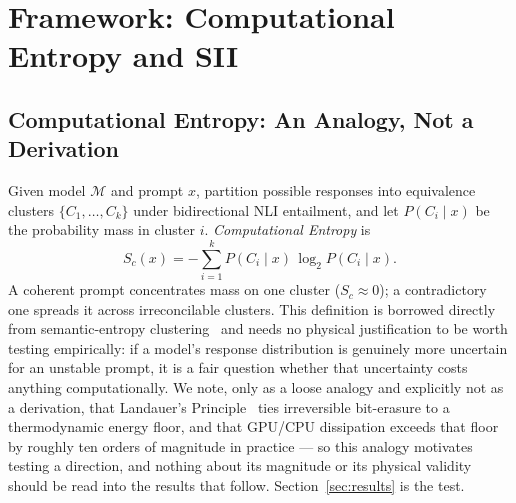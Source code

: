 \documentclass[conference]{IEEEtran}
\begin{document}
\section{Framework: Computational Entropy and SII}
\label{sec:framework}
\subsection{Computational Entropy: An Analogy, Not a Derivation}
Given model $\mathcal{M}$ and prompt $x$, partition possible responses
into equivalence clusters $\{C_1,\ldots,C_k\}$ under bidirectional NLI
entailment, and let $P(C_i\mid x)$ be the probability mass in cluster
$i$. \emph{Computational Entropy} is
\begin{equation}
  S_c(x) = -\sum_{i=1}^{k} P(C_i \mid x)\,\log_2 P(C_i \mid x).
  \label{eq:sc}
\end{equation}
A coherent prompt concentrates mass on one cluster ($S_c\approx0$); a
contradictory one spreads it across irreconcilable clusters. This
definition is borrowed directly from semantic-entropy
clustering~\cite{kuhn2023semantic} and needs no physical justification
to be worth testing empirically: if a model's response distribution is
genuinely more uncertain for an unstable prompt, it is a fair question
whether that uncertainty costs anything computationally. We note, only
as a loose analogy and explicitly not as a derivation, that Landauer's
Principle~\cite{landauer1961irrev} ties irreversible bit-erasure to a
thermodynamic energy floor, and that GPU/CPU dissipation exceeds that
floor by roughly ten orders of magnitude in practice --- so this
analogy motivates testing a direction, and nothing about its magnitude
or its physical validity should be read into the results that follow.
Section~\ref{sec:results} is the test.
\end{document}
